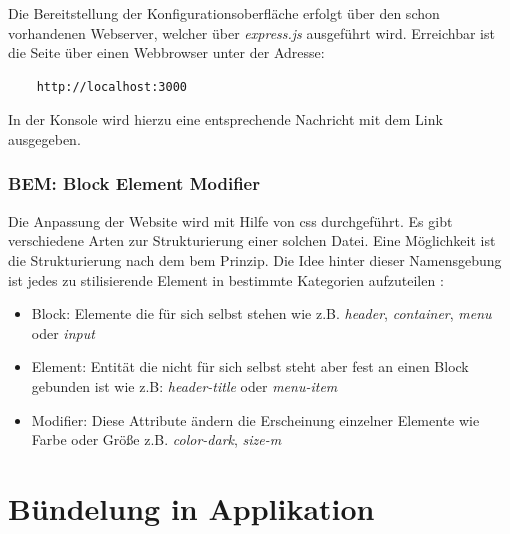 Die Bereitstellung der Konfigurationsoberfläche erfolgt über den schon vorhandenen Webserver, welcher über \textit{express.js} ausgeführt wird. Erreichbar ist die Seite über einen Webbrowser unter der Adresse:

\begin{verbatim}
    http://localhost:3000
\end{verbatim}

In der Konsole wird hierzu eine entsprechende Nachricht mit dem Link ausgegeben.

\subsubsection{BEM: Block Element Modifier}
Die Anpassung der Website wird mit Hilfe von \gls{css} durchgeführt. Es gibt verschiedene Arten zur Strukturierung einer solchen Datei. Eine Möglichkeit ist die Strukturierung nach dem \gls{bem} Prinzip. Die Idee hinter dieser Namensgebung ist jedes zu stilisierende Element in bestimmte Kategorien aufzuteilen \cite{VsevolodStrukchinsky.2020, Finelli.October2017}:

\begin{itemize}
    \item Block: Elemente die für sich selbst stehen wie z.B.  \textit{header}, \textit{container}, \textit{menu} oder \textit{input}
    \item Element: Entität die nicht für sich selbst steht aber fest an einen Block gebunden ist wie z.B: \textit{header-title} oder \textit{menu-item}
    \item Modifier: Diese Attribute ändern die Erscheinung einzelner Elemente wie Farbe oder Größe z.B. \textit{color-dark}, \textit{size-m}
\end{itemize}

\section{Bündelung in Applikation} \label{sec:bundle}

